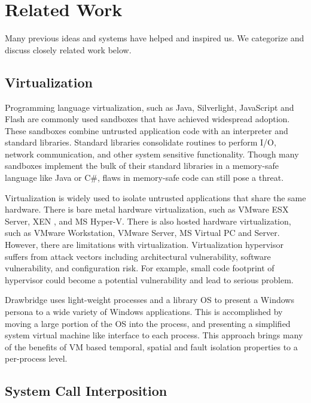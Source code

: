 \section{Related Work}
\label{sec.related_work}


Many previous ideas and systems have helped and inspired us. We categorize and discuss closely related work below.


\subsection{Virtualization}

Programming language virtualization, such as Java, Silverlight, JavaScript and Flash are commonly used sandboxes that 
have achieved widespread adoption. These sandboxes combine untrusted application code with an interpreter and 
standard libraries. Standard libraries consolidate routines to perform I/O, network communication, and other system sensitive 
functionality. Though many sandboxes implement the bulk of their standard libraries in a memory-safe language like 
Java or C\#, flaws in memory-safe code can still pose a threat.

Virtualization is widely used to isolate untrusted applications that share the same hardware. There is bare metal hardware 
virtualization, such as VMware ESX Server, XEN \cite{Xen:03}, and MS Hyper-V. There is also hosted hardware virtualization, 
such as VMware Workstation, VMware Server, MS Virtual PC and Server. However, there are limitations with virtualization. 
Virtualization hypervisor suffers from attack vectors including architectural vulnerability, software vulnerability, 
and configuration risk. For example, small code footprint of hypervisor could become a potential vulnerability 
and lead to serious problem.

Drawbridge \cite{Drawbridge:11} uses light-weight processes and a library OS to present a Windows persona to 
a wide variety of Windows applications. This is accomplished by moving a large portion of the OS into the process, 
and presenting a simplified system virtual machine like interface to each process. This approach brings many of 
the benefits of VM based temporal, spatial and fault isolation properties to a per-process level.


\subsection{System Call Interposition}

